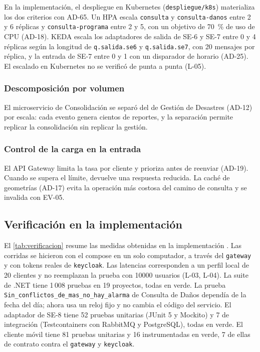 \documentclass[11pt,letterpaper]{article}
\providecommand{\br}{\discretionary{}{}{}}
\begin{document}
En la implementación, el despliegue en Kubernetes (\texttt{despliegue/\br{}k8s}) materializa los dos
criterios con AD-65. Un HPA escala \texttt{consulta} y \texttt{consulta-\br{}danos} entre 2 y 6 réplicas
y \texttt{consulta-\br{}programa} entre 2 y 5, con un objetivo de \qty{70}{\percent} de uso de CPU
(AD-18). KEDA escala los adaptadores de salida de SE-6 y SE-7 entre 0 y 4 réplicas según la
longitud de \texttt{q.salida.se6} y \texttt{q.salida.se7}, con 20 mensajes por réplica, y la
entrada de SE-7 entre 0 y 1 con un disparador de horario (AD-25). El escalado en Kubernetes no se verificó de punta a punta
(L-05).
\subsubsection*{Descomposición por volumen}

El microservicio de Consolidación se separó del de Gestión de
Desastres (AD-12) por escala: cada evento genera cientos de reportes, y la separación
permite replicar la consolidación sin replicar la gestión.
\subsubsection*{Control de la carga en la entrada}

El API Gateway limita la tasa por cliente y prioriza
antes de reenviar (AD-19). Cuando se supera el límite, devuelve una respuesta reducida. La
caché de geometrías (AD-17) evita la operación más costosa del camino de consulta y se
invalida con EV-05.

\subsection{Verificación en la implementación}
\label{sec:verificacion}

El \cref{tab:verificacion} resume las medidas obtenidas en la implementación \cite{revision}. Las
corridas se hicieron con el compose en un solo computador, a través del \texttt{gateway} y con
tokens reales de \texttt{keycloak}. Las latencias corresponden a un perfil local de 20 clientes y no
reemplazan la prueba con \num{10000} usuarios (L-03, L-04). La suite de .NET tiene 1\,008
pruebas en 19 proyectos, todas en verde. La prueba
\texttt{Sin\_\br{}conflictos\_\br{}de\_\br{}mas\_\br{}no\_\br{}hay\_\br{}alarma} de Consulta de Daños dependía de
la fecha del día; ahora usa un reloj fijo y no cambia el código del servicio. El adaptador de SE-8 tiene 52 pruebas unitarias (JUnit 5 y
Mockito) y 7 de integración (Testcontainers con RabbitMQ y PostgreSQL), todas en verde. El cliente móvil tiene 81 pruebas unitarias y 16
instrumentadas en verde, 7 de ellas de contrato contra el \texttt{gateway} y \texttt{keycloak}.
\end{document}
